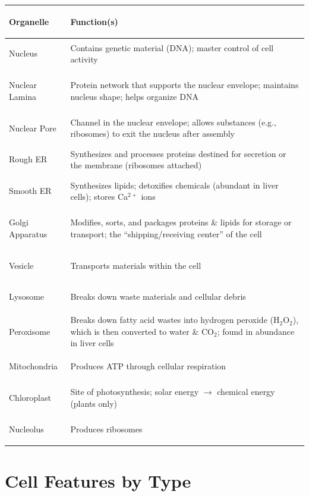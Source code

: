 \documentclass[11pt, letterpaper]{article}
\begin{document}
\noindent
{\setlength{\tabcolsep}{5pt}
\renewcommand{\arraystretch}{1.4}
\begin{tabularx}{\textwidth}{>{\bfseries\raggedright\arraybackslash}p{3cm}>{\raggedright\arraybackslash}X}
\toprule
\rowcolor{tableheader}
\textbf{Organelle} & \textbf{Function(s)} \\
\midrule
\rowcolor{rowA} Nucleus         & Contains genetic material (DNA); master control of cell activity \\
\rowcolor{rowB} Nuclear Lamina  & Protein network that supports the nuclear envelope; maintains nucleus shape; helps organize DNA \\
\rowcolor{rowA} Nuclear Pore    & Channel in the nuclear envelope; allows substances (e.g., ribosomes) to exit the nucleus after assembly \\
\rowcolor{rowB} Rough ER        & Synthesizes and processes proteins destined for secretion or the membrane (ribosomes attached) \\
\rowcolor{rowA} Smooth ER       & Synthesizes lipids; detoxifies chemicals (abundant in liver cells); stores Ca$^{2+}$ ions \\
\rowcolor{rowB} Golgi Apparatus & Modifies, sorts, and packages proteins \& lipids for storage or transport; the ``shipping/receiving center'' of the cell \\
\rowcolor{rowA} Vesicle         & Transports materials within the cell \\
\rowcolor{rowB} Lysosome        & Breaks down waste materials and cellular debris \\
\rowcolor{rowA} Peroxisome      & Breaks down fatty acid wastes into hydrogen peroxide (H$_2$O$_2$), which is then converted to water \& CO$_2$; found in abundance in liver cells \\
\rowcolor{rowB} Mitochondria    & Produces ATP through cellular respiration \\
\rowcolor{rowA} Chloroplast     & Site of photosynthesis; solar energy $\to$ chemical energy (plants only) \\
\rowcolor{rowB} Nucleolus       & Produces ribosomes \\
\bottomrule
\end{tabularx}}

\section*{Cell Features by Type}
\end{document}
